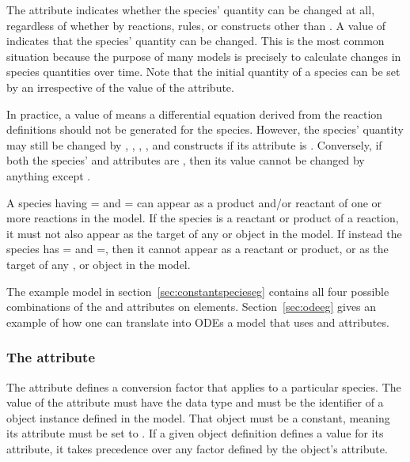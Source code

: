 The  attribute indicates whether the species'
quantity can be changed at all, regardless of whether by
reactions, rules, or constructs other than \InitialAssignment.  A
value of  indicates that the species' quantity can be
changed.  This is the most common situation because the purpose of
many models is precisely to calculate changes in species
quantities over time.  Note that the initial quantity of a species
can be set by an \InitialAssignment irrespective of the value of
the  attribute.

In practice, a  value of  means
a differential equation derived from the reaction definitions
should not be generated for the species.  However, the species'
quantity may still be changed by \AssignmentRule, \RateRule,
\AlgebraicRule, \Event, and \InitialAssignment constructs if its
 attribute is .  Conversely, if both
the species'  and 
attributes are , then its value cannot be changed by
anything except \InitialAssignment.

A species having = and
= can appear as a product and/or
reactant of one or more reactions in the model.  If the species is
a reactant or product of a reaction, it must not also appear as
the target of any \AssignmentRule or \RateRule object in the
model.  If instead the species has
= and
=, then it cannot appear as a reactant
or product, or as the target of any \AssignmentRule, \RateRule or
\EventAssignment object in the model.

The example model in section~\ref{sec:constantspecieseg} contains
all four possible combinations of the 
and  attributes on  elements.
Section~\ref{sec:odeeg} gives an example of how one can translate
into ODEs a model that uses  and
 attributes.


\subsubsection{The  attribute}
\label{sec:species-conversion}

The attribute  defines a conversion factor
that applies to a particular species.  The value of the attribute
must have the data type  and must be the
identifier of a \Parameter object instance defined in the model.
That \Parameter object must be a constant, meaning its
 attribute must be set to .  If a given
\Species object definition defines a value for its
 attribute, it takes precedence over any
factor defined by the \Model object's 
attribute.

